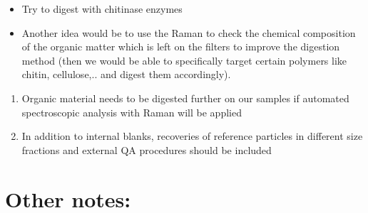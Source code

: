 \documentclass[
  icelandic,
]{book}
\providecommand{\tightlist}{%
  \setlength{\itemsep}{0pt}\setlength{\parskip}{0pt}}
\begin{document}
\begin{itemize}
\tightlist
\item
  Try to digest with chitinase enzymes
\item
  Another idea would be to use the Raman to check the chemical composition of the organic matter which is left on the filters to improve the digestion method (then we would be able to specifically target certain polymers like chitin, cellulose,.. and digest them accordingly).
\end{itemize}

\begin{enumerate}
\def\labelenumi{\arabic{enumi}.}
\setcounter{enumi}{4}
\item
  Organic material needs to be digested further on our samples if automated spectroscopic analysis with Raman will be applied
\item
  In addition to internal blanks, recoveries of reference particles in different size fractions and external QA procedures should be included
\end{enumerate}

\hypertarget{other-notes}{%
\section{Other notes:}\label{other-notes}}
\end{document}
